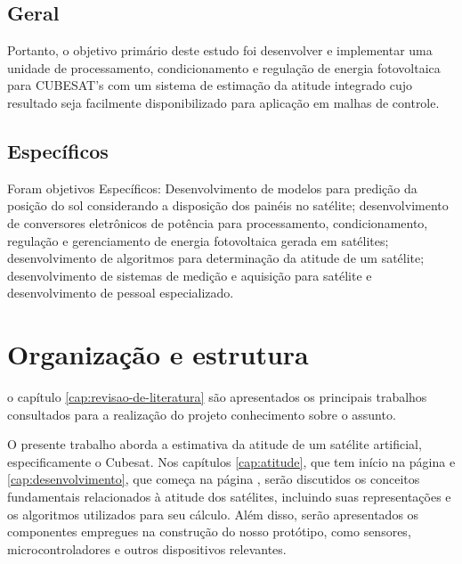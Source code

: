 \documentclass[
	12pt,				%
	openright,			%
	oneside,			%
	a4paper,			%
	english,			%
	brazil				%
	]{abntex2}
\begin{document}
\subsection*{Geral}

Portanto, o objetivo primário deste estudo foi desenvolver e implementar uma unidade de processamento, condicionamento e regulação de energia fotovoltaica para CUBESAT’s com um sistema de estimação da atitude integrado cujo resultado seja facilmente disponibilizado para aplicação em malhas de controle.
%
\subsection*{Específicos}

 Foram objetivos Específicos: Desenvolvimento de modelos para predição da posição do sol considerando a disposição dos painéis no satélite; desenvolvimento de conversores eletrônicos de potência para processamento, condicionamento, regulação e gerenciamento de energia fotovoltaica gerada em satélites; desenvolvimento de algoritmos para determinação da atitude de um satélite; desenvolvimento de sistemas de medição e aquisição para satélite e desenvolvimento de pessoal especializado.
%

\section{Organização e estrutura}


o capítulo \ref{cap:revisao-de-literatura} são apresentados os principais trabalhos consultados para a realização do projeto conhecimento sobre o assunto.

O presente trabalho aborda a estimativa da atitude de um satélite artificial, especificamente o Cubesat. Nos capítulos \ref{cap:atitude}, que tem início na página \pageref{cap:atitude} e  \ref{cap:desenvolvimento}, que começa na página \pageref{cap:desenvolvimento}, serão discutidos os conceitos fundamentais relacionados à atitude dos satélites, incluindo suas representações e os algoritmos utilizados para seu cálculo. Além disso, serão apresentados os componentes empregues na construção do nosso protótipo, como sensores, microcontroladores e outros dispositivos relevantes.
\end{document}
